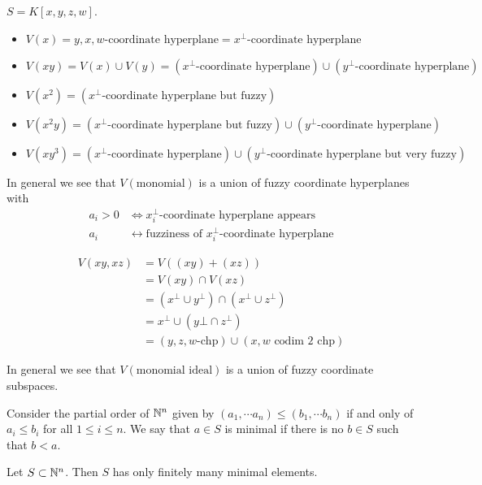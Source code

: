 \begin{example}
    $S = K [ x,y,z,w]$.
    \begin{itemize}
        \item $V(x) = y,x,w \text{-coordinate hyperplane} = x^\bot\text{-coordinate hyperplane}$
        \item $V(xy) = V(x) \cup V(y) = (x^\bot\text{-coordinate hyperplane}) \cup (y^\bot\text{-coordinate hyperplane})$
        \item $V(x^2) = (x^\bot\text{-coordinate hyperplane but fuzzy})$
        \item $V(x^2y) = (x^\bot\text{-coordinate hyperplane but fuzzy}) \cup (y^\bot\text{-coordinate hyperplane})$
        \item $V(xy^3) = (x^\bot\text{-coordinate hyperplane}) \cup (y^\bot\text{-coordinate hyperplane but very fuzzy})$
    \end{itemize}
\end{example}

In general we see that $V(\text{monomial})$ is a union of fuzzy coordinate hyperplanes with
\begin{align*}
    a_i > 0 &\iff x_i^\bot\text{-coordinate hyperplane appears}\\
    a_i &\longleftrightarrow \text{fuzziness of } x_i^\bot\text{-coordinate hyperplane}
\end{align*}

\begin{example}
    \phantom{.}
    \begin{align*}
        V(xy, xz) &= V ( (xy) + (xz) )\\
        &= V(xy) \cap V(xz)\\
        &=(x^\bot \cup y^\bot) \cap (x^\bot \cup z^\bot)\\
        &= x^\bot \cup (y\bot \cap z^\bot)\\
        &= (y,z, w\text{-chp}) \cup (x, w\text{ codim 2 chp})
    \end{align*}
\end{example}

In general we see that $V(\text{monomial ideal})$ is a union of fuzzy coordinate subspaces.

Consider the partial order of $\mathbb{N}^n$ given by $(a_1 , \cdots a_n) \leq (b_1 , \cdots b_n)$ if and only of $a_i \leq b_i $ for all $1 \leq i \leq n$. We say that $a \in S$ is minimal if there is no $b \in S$ such that $b < a$.

\begin{theorem}
Let $S \subset \mathbb{N}^n$. Then $S $ has only finitely many minimal elements.
\end{theorem}


